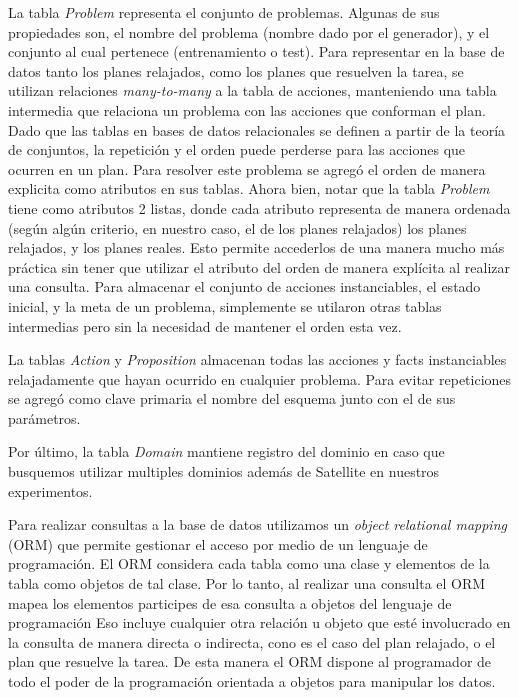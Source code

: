 La tabla \emph{Problem} representa el conjunto de problemas. Algunas de sus
propiedades son, el nombre del problema (nombre dado por el generador), y el
conjunto al cual pertenece (entrenamiento o test). Para representar en la base
de datos tanto los planes relajados, como los planes que resuelven la tarea, se
utilizan relaciones \emph{many-to-many} a la tabla de acciones, manteniendo una
tabla intermedia que relaciona un problema con las acciones que conforman el
plan. Dado que las tablas en bases de datos relacionales se definen a partir de
la teoría de conjuntos, la repetición y el orden puede perderse para las
acciones que ocurren en un plan. Para resolver este problema se agregó el orden
de manera explicita como atributos en sus tablas. Ahora bien, notar que la tabla
\emph{Problem} tiene como atributos 2 listas, donde cada atributo representa de
manera ordenada (según algún criterio, en nuestro caso, el de los planes
relajados) los planes relajados, y los planes reales. Esto permite accederlos de
una manera mucho más práctica sin tener que utilizar el atributo del orden de
manera explícita al realizar una consulta. Para almacenar el conjunto de
acciones instanciables, el estado inicial, y la meta de un problema, simplemente
se utilaron otras tablas intermedias pero sin la necesidad de mantener el orden
esta vez.

La tablas \emph{Action} y \emph{Proposition} almacenan todas las acciones y
facts instanciables relajadamente que hayan ocurrido en cualquier problema. Para
evitar repeticiones se agregó como clave primaria el nombre del esquema junto
con el de sus parámetros.

Por último, la tabla \emph{Domain} mantiene registro del dominio en caso que
busquemos utilizar multiples dominios además de Satellite en nuestros
experimentos.

Para realizar consultas a la base de datos utilizamos un \emph{object relational
mapping} (ORM) que permite gestionar el acceso por medio de un lenguaje de
programación. El ORM considera cada tabla como una clase y elementos de la tabla
como objetos de tal clase. Por lo tanto, al realizar una consulta el ORM mapea
los elementos participes de esa consulta a objetos del lenguaje de programación
Eso incluye cualquier otra relación u objeto que esté involucrado en la consulta
de manera directa o indirecta, cono es el caso del plan relajado, o el plan que
resuelve la tarea. De esta manera el ORM dispone al programador de todo el poder
de la programación orientada a objetos para manipular los datos.

